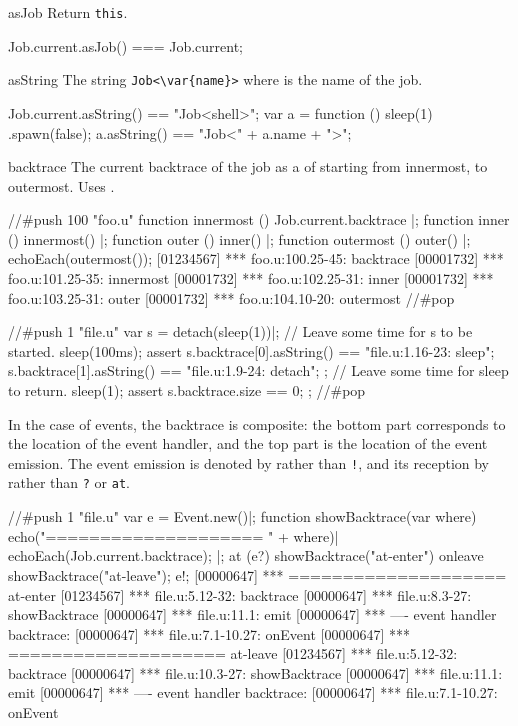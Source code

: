\begin{urbiscriptapi}
\item[asJob]
  Return \lstinline|this|.
\begin{urbiassert}
Job.current.asJob() === Job.current;
\end{urbiassert}


\item[asString] The string \lstinline|Job<\var{name}>| where  is
  the name of the job.
\begin{urbiassert}
Job.current.asString() == "Job<shell>";
var a = function () { sleep(1) }.spawn(false);
a.asString() == "Job<" + a.name + ">";
\end{urbiassert}


\item[backtrace] The current backtrace of the job as a  of
   starting from innermost, to outermost.
  Uses .

\begin{urbiscript}
//#push 100 "foo.u"
function innermost () { Job.current.backtrace }|;
function inner ()     { innermost() }|;
function outer ()     { inner() }|;
function outermost () { outer() }|;
echoEach(outermost());
[01234567] *** foo.u:100.25-45: backtrace
[00001732] *** foo.u:101.25-35: innermost
[00001732] *** foo.u:102.25-31: inner
[00001732] *** foo.u:103.25-31: outer
[00001732] *** foo.u:104.10-20: outermost
//#pop

//#push 1 "file.u"
var s = detach(sleep(1))|;
// Leave some time for s to be started.
sleep(100ms);
assert
{
  s.backtrace[0].asString() == "file.u:1.16-23: sleep";
  s.backtrace[1].asString() == "file.u:1.9-24: detach";
};
// Leave some time for sleep to return.
sleep(1);
assert
{
  s.backtrace.size == 0;
};
//#pop
\end{urbiscript}

  In the case of events, the backtrace is composite: the bottom part
  corresponds to the location of the event handler, and the top part is the
  location of the event emission.  The event emission is denoted by
   rather than \lstinline|!|, and its reception by
   rather than \lstinline|?| or \lstinline|at|.

\begin{urbiscript}
//#push 1 "file.u"
var e = Event.new()|;
function showBacktrace(var where)
{
  echo("==================== " + where)|
  echoEach(Job.current.backtrace);
}|;
at (e?)
  showBacktrace("at-enter")
onleave
  showBacktrace("at-leave");
e!;
[00000647] *** ==================== at-enter
[01234567] *** file.u:5.12-32: backtrace
[00000647] *** file.u:8.3-27: showBacktrace
[00000647] *** file.u:11.1: emit
[00000647] *** ---- event handler backtrace:
[00000647] *** file.u:7.1-10.27: onEvent
[00000647] *** ==================== at-leave
[01234567] *** file.u:5.12-32: backtrace
[00000647] *** file.u:10.3-27: showBacktrace
[00000647] *** file.u:11.1: emit
[00000647] *** ---- event handler backtrace:
[00000647] *** file.u:7.1-10.27: onEvent



\end{urbiscript}
\end{urbiscriptapi}
